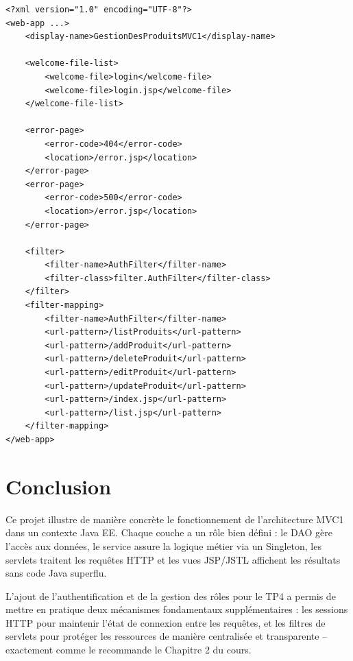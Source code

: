 \documentclass[12pt, a4paper]{article}
\begin{document}
\begin{lstlisting}[style=xmlstyle, caption=WEB-INF/web.xml]
<?xml version="1.0" encoding="UTF-8"?>
<web-app ...>
    <display-name>GestionDesProduitsMVC1</display-name>

    <welcome-file-list>
        <welcome-file>login</welcome-file>
        <welcome-file>login.jsp</welcome-file>
    </welcome-file-list>

    <error-page>
        <error-code>404</error-code>
        <location>/error.jsp</location>
    </error-page>
    <error-page>
        <error-code>500</error-code>
        <location>/error.jsp</location>
    </error-page>

    <filter>
        <filter-name>AuthFilter</filter-name>
        <filter-class>filter.AuthFilter</filter-class>
    </filter>
    <filter-mapping>
        <filter-name>AuthFilter</filter-name>
        <url-pattern>/listProduits</url-pattern>
        <url-pattern>/addProduit</url-pattern>
        <url-pattern>/deleteProduit</url-pattern>
        <url-pattern>/editProduit</url-pattern>
        <url-pattern>/updateProduit</url-pattern>
        <url-pattern>/index.jsp</url-pattern>
        <url-pattern>/list.jsp</url-pattern>
    </filter-mapping>
</web-app>
\end{lstlisting}

\section{Conclusion}

Ce projet illustre de manière concrète le fonctionnement de l'architecture MVC1 dans un contexte Java EE. Chaque couche a un rôle bien défini : le DAO gère l'accès aux données, le service assure la logique métier via un Singleton, les servlets traitent les requêtes HTTP et les vues JSP/JSTL affichent les résultats sans code Java superflu.

L'ajout de l'authentification et de la gestion des rôles pour le TP4 a permis de mettre en pratique deux mécanismes fondamentaux supplémentaires : les sessions HTTP pour maintenir l'état de connexion entre les requêtes, et les filtres de servlets pour protéger les ressources de manière centralisée et transparente -- exactement comme le recommande le Chapitre 2 du cours.
\end{document}
